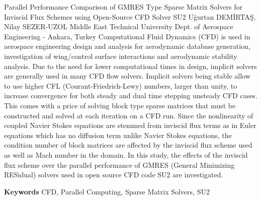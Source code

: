 
    \begin{abstract_online}{Parallel Performance Comparison of GMRES Type Sparse Matrix Solvers for Inviscid Flux Schemes using Open-Source CFD Solver SU2}{%
        Uğurtan DEMİRTAŞ, Nilay SEZER-UZOL}{%
        }{%
        Middle East Technical University Dept. of Aerospace Engineering - Ankara, Turkey}
    Computational Fluid Dynamics (CFD) is used in aerospace engineering design and analysis for aerodynamic database generation, investigation of wing/control surface interactions and aerodynamic stability analysis. Due to the need for lower computational times in design, implicit solvers are generally used in many CFD flow solvers. Implicit solvers being stable allow to use higher CFL (Courant-Friedrich-Lewy) numbers, larger than unity, to increase convergence for both steady and dual time stepping unsteady CFD cases. This comes with a price of solving block type sparse matrices that must be constructed and solved at each iteration on a CFD run. Since the nonlinearity of coupled Navier Stokes equations are stemmed from inviscid flux terms as in Euler equations which has no diffusion term unlike Navier Stokes equations, the condition number of block matrices are affected by the inviscid flux scheme used as well as Mach number in the domain. In this study, the effects of the inviscid flux scheme over the parallel performance of GMRES (General Minimizing RESidual) solvers used in open source CFD code SU2 are investigated. 
    
        \textbf{Keywords} \newline{}CFD, Parallel Computing, Sparse Matrix Solvers, SU2
    \end{abstract_online}
    